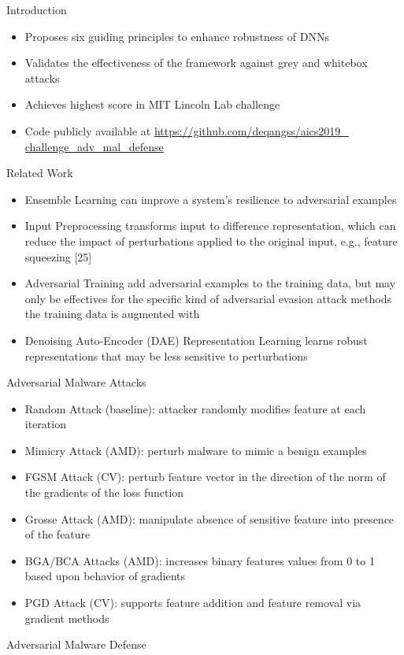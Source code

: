\documentclass{article}
\begin{document}
Introduction
\begin{itemize}
\item Proposes six guiding principles to enhance robustness of DNNs
\item Validates the effectiveness of the framework against grey and whitebox attacks
\item Achieves highest score in MIT Lincoln Lab challenge
\item Code publicly available at \url{https://github.com/deqangss/aics2019_ challenge_adv_mal_defense}
\end{itemize}
Related Work
\begin{itemize}
\item Ensemble Learning can improve a system's resilience to adversarial examples
\item Input Preprocessing transforms input to difference representation, which can reduce the impact of perturbations applied to the original input, e.g., feature squeezing [25]
\item Adversarial Training add adversarial examples to the training data, but may only be effectives for the specific kind of adversarial evasion attack methods the training data is augmented with
\item Denoising Auto-Encoder (DAE) Representation Learning learns robust representations that may be less sensitive to perturbations
\end{itemize}
Adversarial Malware Attacks
\begin{itemize}
\item Random Attack (baseline): attacker randomly modifies feature at each iteration
\item Mimicry Attack (AMD): perturb malware to mimic a benign examples
\item FGSM Attack (CV): perturb feature vector in the direction of the norm of the gradients of the loss function
\item Grosse Attack (AMD): manipulate absence of sensitive feature into presence of the feature
\item BGA/BCA Attacks (AMD): increases binary features values from 0 to 1 based upon behavior of gradients
\item PGD Attack (CV): supports feature addition and feature removal via gradient methods
\end{itemize}
Adversarial Malware Defense
\end{document}
